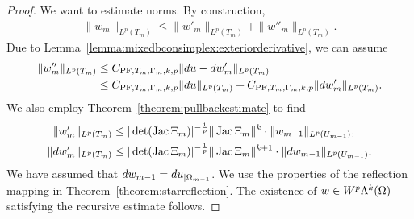 \documentclass[10pt,letterpaper]{article}
\begin{document}
\begin{proof}
    We want to estimate norms. 
    By construction,
    \begin{align*}
        \| w_{m} \|_{L^{p}(T_{m})}
        \leq  
        \| w'_{m} \|_{L^{p}(T_{m})}
        + 
        \| w''_{m} \|_{L^{p}(T_{m})}
        .
    \end{align*}
    Due to Lemma~\ref{lemma:mixedbconsimplex:exteriorderivative},
    we can assume 
    \begin{align*}
        \| w''_{m} \|_{L^{p}(T_{m})} 
        &
        \leq 
        C_{{\rm PF},T_{m},\Gamma_{m},k,p} \| d u - d w'_{m} \|_{L^{p}(T_{m})}
        \\&
        \leq 
        C_{{\rm PF},T_{m},\Gamma_{m},k,p} \| d u      \|_{L^{p}(T_{m})} 
        + 
        C_{{\rm PF},T_{m},\Gamma_{m},k,p} \| d w'_{m} \|_{L^{p}(T_{m})} 
        .
    \end{align*}
    We also employ Theorem~\ref{theorem:pullbackestimate} to find 
    \begin{align*}
        \| w'_{m} \|_{L^{p}(T_{m})}
        &\leq 
        |\det(\operatorname{{\rm Jac}} \Xi_{m}  )|^{-\frac 1 p} 
        \| \operatorname{{\rm Jac}} \Xi_{m} \|^{k}
        \cdot 
        \| w_{m-1} \|_{L^{p}(U_{m-1})}
        ,
        \\
        \| d w'_{m} \|_{L^{p}(T_{m})}
        &\leq 
        |\det(\operatorname{{\rm Jac}} \Xi_{m}  )|^{-\frac 1 p} 
        \| \operatorname{{\rm Jac}} \Xi_{m} \|^{k+1}
        \cdot 
        \| d w_{m-1} \|_{L^{p}(U_{m-1})}
        .
    \end{align*}
    We have assumed that $d w_{m-1} = d u_{|\Omega_{m-1}}$. 
    We use the properties of the reflection mapping in Theorem~\ref{theorem:starreflection}. 
    The existence of $w \in W^{p}\Lambda^{k}(\Omega)$ satisfying the recursive estimate follows. 
\end{proof}
\end{document}
